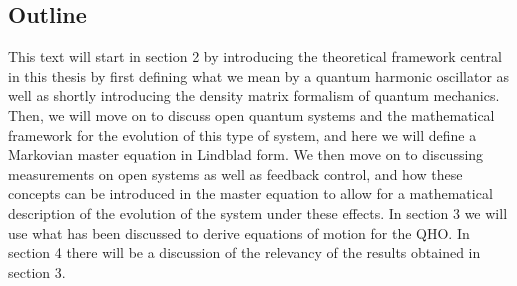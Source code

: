 \subsection{Outline}
This text will start in section 2 by introducing the theoretical framework central in this thesis by first defining what we mean by a quantum harmonic oscillator as well as shortly introducing the density matrix formalism of quantum mechanics. Then, we will move on to discuss open quantum systems and the mathematical framework for the evolution of this type of system, and here we will define a Markovian master equation in Lindblad form. We then move on to discussing measurements on open systems as well as feedback control, and how these concepts can be introduced in the master equation to allow for a mathematical description of the evolution of the system under these effects. In section 3 we will use what has been discussed to derive equations of motion for the QHO. In section 4 there will be a discussion of the relevancy of the results obtained in section 3.


